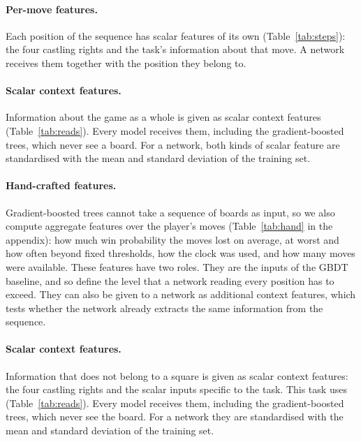 \paragraph{Per-move features.}
Each position of the sequence has  scalar features of its
own (Table~\ref{tab:steps}): the four castling rights and the task's
information about that move. A network receives them together with the
position they belong to.

\begin{table}[htbp]\centering\small
{}
\caption{Per-move features: the scalar inputs attached to each position of a
sequence.}
\label{tab:steps}
\end{table}

\paragraph{Scalar context features.}
Information about the game as a whole is given as 
scalar context features (Table~\ref{tab:reads}). Every model receives them,
including the gradient-boosted trees, which never see a board. For a network,
both kinds of scalar feature are standardised with the mean and standard
deviation of the training set.

\begin{table}[htbp]\centering\small
{}
\caption{Scalar context features: the game-level inputs given to every
model.}
\label{tab:reads}
\end{table}

\paragraph{Hand-crafted features.}
Gradient-boosted trees cannot take a sequence of boards as input, so we also
compute  aggregate features over the player's moves
(Table~\ref{tab:hand} in the appendix): how much win probability the moves
lost on average, at worst and how often beyond fixed thresholds, how the clock
was used, and how many moves were available. These features have two roles.
They are the inputs of the GBDT baseline, and so define the level that a
network reading every position has to exceed. They can also be given to a
network as additional context features, which tests whether the network
already extracts the same information from the sequence.

\else
\paragraph{Scalar context features.}
Information that does not belong to a square is given as scalar context
features: the four castling rights and the scalar inputs specific to the
task. This task uses  (Table~\ref{tab:reads}). Every
model receives them, including the gradient-boosted trees, which never see
the board. For a network they are standardised with the mean and standard
deviation of the training set.

